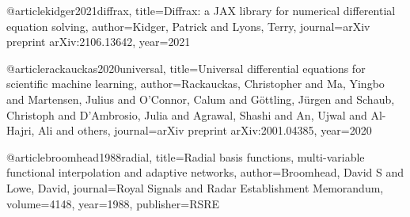@article{kidger2021diffrax,
	title={{Diffrax: a JAX library for numerical differential equation solving}},
	author={Kidger, Patrick and Lyons, Terry},
	journal={arXiv preprint arXiv:2106.13642},
	year={2021}
}

@article{rackauckas2020universal,
	title={Universal differential equations for scientific machine learning},
	author={Rackauckas, Christopher and Ma, Yingbo and Martensen, Julius and O'Connor, Calum and G{\"o}ttling, J{\"u}rgen and Schaub, Christoph and D'Ambrosio, Julia and Agrawal, Shashi and An, Ujwal and Al-Hajri, Ali and others},
	journal={arXiv preprint arXiv:2001.04385},
	year={2020}
}

@article{broomhead1988radial,
	title={Radial basis functions, multi-variable functional interpolation and adaptive networks},
	author={Broomhead, David S and Lowe, David},
	journal={Royal Signals and Radar Establishment Memorandum},
	volume={4148},
	year={1988},
	publisher={RSRE}
}